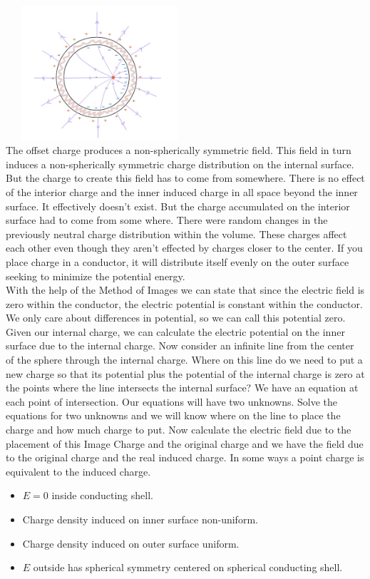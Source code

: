 \documentclass[fleqn]{article}
\begin{document}
\begin{enumerate}
      \textcolor{hwColor}{
        \\
        \includegraphics[height=5cm, width=7cm]{Seven.JPG}
        \\
        The offset charge produces a non-spherically symmetric field. This field in turn induces a non-spherically symmetric charge distribution 
        on the internal surface. But the charge to create this field has to come from somewhere. There is no effect of the interior charge 
        and the inner induced charge in all space beyond the inner surface. It effectively doesn't exist. But the charge accumulated on 
        the interior surface had to come from some where. There were random changes in the previously neutral charge distribution within 
        the volume. These charges affect each other even though they aren't effected by charges closer to the center. If you place charge
        in a conductor, it will distribute itself evenly on the outer surface seeking to minimize the potential energy.
        \\
        With the help of the Method of Images we can state that since the electric field is zero within the conductor, the electric potential is constant within
        the conductor. We only care about differences in potential, so we can call this potential zero. Given our internal charge, we can calculate 
        the electric potential on the inner surface due to the internal charge. Now consider an infinite line from the center of the sphere 
        through the internal charge. Where on this line do we need to put a new charge so that its potential plus the potential of the internal 
        charge is zero at the points where the line intersects the internal surface? We have an equation at each point of intersection. Our 
        equations will have two unknowns. Solve the equations for two unknowns and we will know where on the line to place the charge and how much
        charge to put. Now calculate the electric field due to the placement of this Image Charge and the original charge and we have the field 
        due to the original charge and the real induced charge. In some ways a point charge is equivalent to the induced charge.
        \begin{itemize}
          \item $E=0$ inside conducting shell.
          \item Charge density induced on inner surface non-uniform.
          \item Charge density induced on outer surface uniform.
          \item $E$ outside has spherical symmetry centered on spherical conducting shell.
        \end{itemize}
      }



\end{enumerate}
\end{document}
